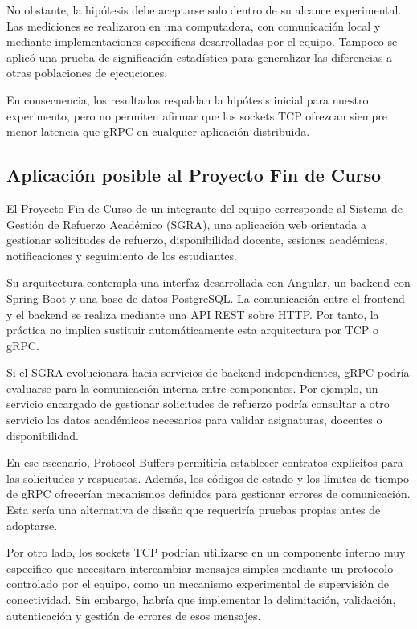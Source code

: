 No obstante, la hipótesis debe aceptarse solo
dentro de su alcance experimental. Las mediciones
se realizaron en una computadora, con comunicación
local y mediante implementaciones específicas
desarrolladas por el equipo. Tampoco se aplicó
una prueba de significación estadística para
generalizar las diferencias a otras poblaciones
de ejecuciones.

En consecuencia, los resultados respaldan la
hipótesis inicial para nuestro experimento,
pero no permiten afirmar que los sockets TCP
ofrezcan siempre menor latencia que gRPC
en cualquier aplicación distribuida.

\subsection{Aplicación posible al Proyecto Fin de Curso}

El Proyecto Fin de Curso de un integrante del equipo corresponde
al Sistema de Gestión de Refuerzo Académico
(SGRA), una aplicación web orientada a gestionar
solicitudes de refuerzo, disponibilidad docente,
sesiones académicas, notificaciones y seguimiento
de los estudiantes.

Su arquitectura contempla una interfaz desarrollada
con Angular, un backend con Spring Boot y una
base de datos PostgreSQL. La comunicación entre
el frontend y el backend se realiza mediante
una API REST sobre HTTP. Por tanto, la práctica
no implica sustituir automáticamente esta
arquitectura por TCP o gRPC.

Si el SGRA evolucionara hacia servicios de
backend independientes, gRPC podría evaluarse
para la comunicación interna entre componentes.
Por ejemplo, un servicio encargado de gestionar
solicitudes de refuerzo podría consultar a
otro servicio los datos académicos necesarios
para validar asignaturas, docentes o
disponibilidad.

En ese escenario, Protocol Buffers permitiría
establecer contratos explícitos para las
solicitudes y respuestas. Además, los códigos
de estado y los límites de tiempo de gRPC
ofrecerían mecanismos definidos para gestionar
errores de comunicación. Esta sería una
alternativa de diseño que requeriría pruebas
propias antes de adoptarse.

Por otro lado, los sockets TCP podrían utilizarse
en un componente interno muy específico que
necesitara intercambiar mensajes simples mediante
un protocolo controlado por el equipo, como un
mecanismo experimental de supervisión de
conectividad. Sin embargo, habría que implementar
la delimitación, validación, autenticación y
gestión de errores de esos mensajes.

